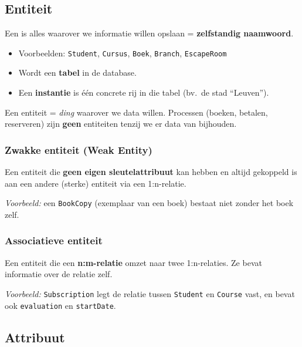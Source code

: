 \documentclass[a4paper,11pt]{article}
\begin{document}
\subsection{Entiteit}

\begin{theorie}
Een  is alles waarover we informatie willen opslaan = \textbf{zelfstandig naamwoord}.
\begin{itemize}
  \item Voorbeelden: \texttt{Student}, \texttt{Cursus}, \texttt{Boek}, \texttt{Branch}, \texttt{EscapeRoom}
  \item Wordt een \textbf{tabel} in de database.
  \item Een \textbf{instantie} is één concrete rij in die tabel (bv.\ de stad ``Leuven'').
\end{itemize}
\end{theorie}

\begin{waarschuwing}
Een entiteit = \emph{ding} waarover we data willen. Processen (boeken, betalen, reserveren) zijn \textbf{geen} entiteiten tenzij we er data van bijhouden.
\end{waarschuwing}

\subsubsection*{Zwakke entiteit (Weak Entity)}
Een entiteit die \textbf{geen eigen sleutelattribuut} kan hebben en altijd gekoppeld is aan een andere (sterke) entiteit via een 1:n-relatie.

\textit{Voorbeeld:} een \texttt{BookCopy} (exemplaar van een boek) bestaat niet zonder het boek zelf.

\subsubsection*{Associatieve entiteit}
Een entiteit die een \textbf{n:m-relatie} omzet naar twee 1:n-relaties. Ze bevat informatie over de relatie zelf.

\textit{Voorbeeld:} \texttt{Subscription} legt de relatie tussen \texttt{Student} en \texttt{Course} vast, en bevat ook \texttt{evaluation} en \texttt{startDate}.

\subsection{Attribuut}
\end{document}
